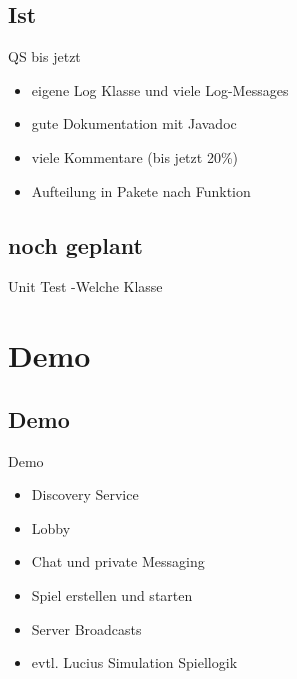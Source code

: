 \documentclass[12pt, utf8]{beamer}
\begin{document}
\subsection{Ist}
\begin{frame}{QS bis jetzt}
\begin{itemize}
\item eigene Log Klasse und viele Log-Messages
\item gute Dokumentation mit Javadoc
\item viele Kommentare (bis jetzt 20\%)
\item Aufteilung in Pakete nach Funktion
\end{itemize}
\end{frame}

\subsection{noch geplant}
\begin{frame}
Unit Test
-Welche Klasse
\end{frame}


\section{Demo}
\subsection{Demo}
\begin{frame}{Demo}
\begin{itemize}
\item Discovery Service
\item Lobby
\item Chat und private Messaging
\item Spiel erstellen und starten
\item Server Broadcasts
\item evtl. Lucius Simulation Spiellogik
\end{itemize}
\end{frame}
\end{document}
